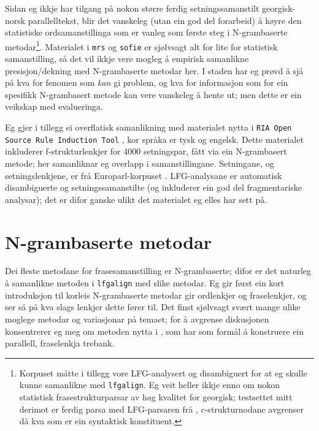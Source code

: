 \documentclass[11pt,a4paper,oneside,draft]{report}
\begin{document}
 Sidan eg ikkje har tilgang på nokon større ferdig setningssamanstilt
 georgisk-norsk parallelltekst, blir det vanskeleg (utan ein god del
 forarbeid) å køyre den statistiske ordsamanstillinga som er vanleg
 som første steg i N-grambaserte metodar\footnote{Korpuset måtte i tillegg vore LFG-analysert og disambiguert
        for at eg skulle kunne samanlikne med \texttt{lfgalign}. Eg veit
        heller ikkje enno om nokon statistisk frasestrukturparsar av
        høg kvalitet for georgisk; testsettet mitt derimot er ferdig
        parsa med LFG-parsaren frå \citet{meurer2008cgg},
        c-strukturnodane avgrenser då kva som er ein syntaktisk
        konstituent. }.  Materialet i \texttt{mrs}
 og \texttt{sofie} er sjølvsagt alt for lite for statistisk samanstilling, så
 det vil ikkje vere mogleg å empirisk samanlikne presisjon/dekning med
 N-grambaserte metodar her. I staden har eg prøvd å sjå på kva for
 fenomen som \emph{kan} gi problem, og kva for informasjon som for ein
 spesifikk N-grambasert metode kan vere vanskeleg å hente ut; men
 dette er ein veikskap med evalueringa.

 Eg gjer i tillegg ei overflatisk samanlikning med materialet nytta i
 \texttt{RIA Open Source Rule Induction Tool}
 \citep{graham2009osr,graham2009fts}, kor språka er tysk og
 engelsk. Dette materialet inkluderer f-strukturlenkjer for 4000
 setningspar, fått via ein N-grambasert metode; her samanliknar eg
 overlapp i samanstillingane.  Setningane, og setningslenkjene, er frå
 Europarl-korpuset \citep{koehn2005emc}. LFG-analysane er automatisk
 disambiguerte og setningssamanstilte (og inkluderer ein god del
 fragmentariske analysar); det er difor ganske ulikt det materialet eg
 elles har sett på.

\section{N-grambaserte metodar}
\label{sec-5.2}


 Dei fleste metodane for frasesamanstilling er N-grambaserte; difor er
 det naturleg å samanlikne metoden i \texttt{lfgalign} med slike metodar. Eg
 gir først ein kort introduksjon til korleis N-grambaserte metodar gir
 ordlenkjer og fraselenkjer, og ser så på kva slags lenkjer dette
 fører til. Det finst sjølvsagt svært mange ulike moglege metodar og
 variasjonar på temaet; for å avgrense diskusjonen konsentrerer eg meg
 om metoden nytta i \citet{samuelsson2007apa}, som har som formål å
 konstruere ein parallell, fraselenkja trebank.
\end{document}
